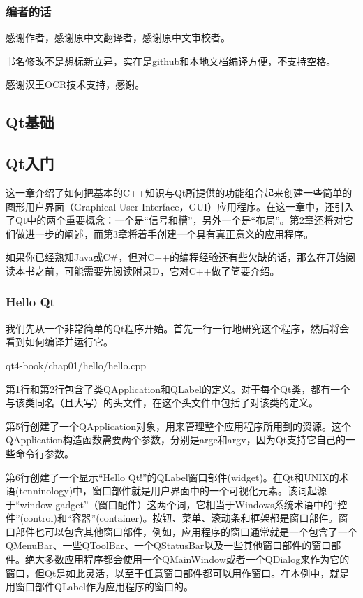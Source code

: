 \documentclass[11pt,oneside]{book}
\begin{document}
\begin{common-format}
\section*{编者的话}
感谢作者，感谢原中文翻译者，感谢原中文审校者。

书名修改不是想标新立异，实在是github和本地文档编译方便，不支持空格。

感谢汉王OCR技术支持，感谢\XeLaTeX 。





\end{common-format}


\setcounter{tocdepth}{2}
\tableofcontents

\begin{common-format}
\mainmatter


\part{Qt基础}
\chapter{Qt入门}
这一章介绍了如何把基本的C++知识与Qt所提供的功能组合起来创建一些简单的图形用户界面（Graphical User Interface，GUI）应用程序。在这一章中，还引入了Qt中的两个重要概念：一个是“信号和槽”，另外一个是“布局”。第2章还将对它们做进一步的阐述，而第3章将着手创建一个具有真正意义的应用程序。  

如果你已经熟知Java或C\#{}，但对C++的编程经验还有些欠缺的话，那么在开始阅读本书之前，可能需要先阅读附录D，它对C++做了简要介绍。

\section{Hello Qt}
我们先从一个非常简单的Qt程序开始。首先一行一行地研究这个程序，然后将会看到如何编译并运行它。

\begin{cppinput}{qt4-book/chap01/hello/hello.cpp}
\end{cppinput}


第1行和第2行包含了类QApplication和QLabel的定义。对于每个Qt类，都有一个与该类同名（且大写）的头文件，在这个头文件中包括了对该类的定义。

第5行创建了一个QApplication对象，用来管理整个应用程序所用到的资源。这个QApplication构造函数需要两个参数，分别是argc和argv，因为Qt支持它自己的一些命令行参数。

第6行创建了一个显示“Hello Qt!”的QLabel窗口部件(widget)。在Qt和UNIX的术语(tenninology)中，窗口部件就是用户界面中的一个可视化元素。该词起源于“window gadget”（窗口配件）这两个词，它相当于Windows系统术语中的“控件”(control)和“容器”(container)。按钮、菜单、滚动条和框架都是窗口部件。窗口部件也可以包含其他窗口部件，例如，应用程序的窗口通常就是一个包含了一个QMenuBar、一些QToolBar、一个QStatusBar以及一些其他窗口部件的窗口部件。绝大多数应用程序都会使用一个QMainWindow或者一个QDialog来作为它的窗口，但Qt是如此灵活，以至于任意窗口部件都可以用作窗口。在本例中，就是用窗口部件QLabel作为应用程序的窗口的。   


\end{common-format}
\end{document}
